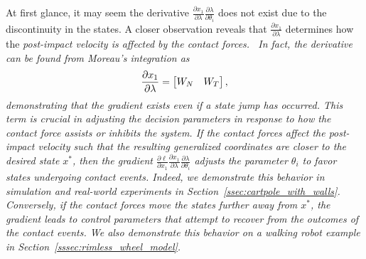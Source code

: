 %
At first glance, it may seem the derivative $\frac{\partial x_1}{\partial
\lambda}\frac{\partial \lambda}{\partial \theta_i}$ does not exist due to
the discontinuity in the states. 
%
A closer observation reveals that  $\frac{\partial x_1}{\partial \lambda}$
determines how the \it{post-impact velocity is affected by the
contact forces}.~\normalfont
%
In fact, the derivative can be found from Moreau's integration as 
\begin{align*}
    \frac{\partial x_1}{\partial \lambda} = \begin{bmatrix}W_N & W_T \end{bmatrix}, 
\end{align*}
%
demonstrating that the gradient exists even if a state jump has occurred. 
%
This term is crucial in adjusting the decision parameters in response to how the
contact force assists or inhibits the system.
%
If the contact forces affect the \it{post-impact} \normalfont velocity such that
the resulting generalized coordinates are closer to the desired state $x^*$,
then the gradient $\frac{\partial \ell}{\partial x_1} \frac{\partial
x_1}{\partial \lambda}\frac{\partial \lambda}{\partial \theta_i}$ adjusts the
parameter $\theta_i$ to favor states undergoing contact events. 
%
Indeed, we demonstrate this behavior in simulation and real-world experiments in
Section~\ref{ssec:cartpole_with_walls}.
%
Conversely, if the contact forces move the states further away from $x^*$, the
gradient leads to control parameters that attempt to recover from the outcomes
of the contact events.
%
We also demonstrate this behavior on a walking robot example in
Section~\ref{sssec:rimless_wheel_model}.

